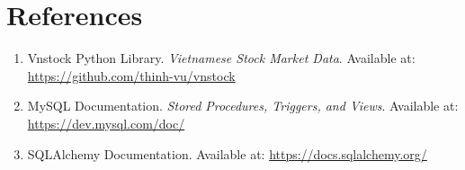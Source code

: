 \documentclass[a4paper,11pt,oneside]{book}
\begin{document}









\backmatter
\chapter*{References}

\begin{enumerate}
    \item Vnstock Python Library. \textit{Vietnamese Stock Market Data}. Available at: \url{https://github.com/thinh-vu/vnstock}
    \item MySQL Documentation. \textit{Stored Procedures, Triggers, and Views}. Available at: \url{https://dev.mysql.com/doc/}
    \item SQLAlchemy Documentation. Available at: \url{https://docs.sqlalchemy.org/}
\end{enumerate}
\end{document}

